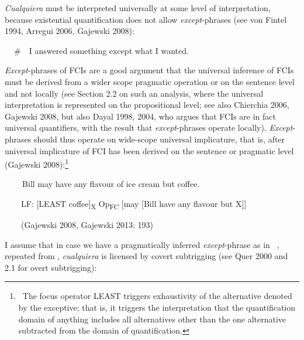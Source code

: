 \begin{styleStandard}
\textit{Cualquiera }must be interpreted universally at some level of interpretation, because existential quantification does not allow \textit{except}{}-phrases (see von Fintel 1994, Arregui 2006, Gajewski 2008):
\end{styleStandard}

\begin{styleStandard}
\textbf{\ \ }\#\ \ I answered something except what I wanted.
\end{styleStandard}

\begin{styleStandard}
\textit{Except}{}-phrases of FCIs are a good argument that the universal inference of FCIs must be derived from a wider scope pragmatic operation or on the sentence level and not locally (see Section 2.2 on such an analysis, where the universal interpretation is represented on the propositional level; see also Chierchia 2006, Gajewski 2008, but also Dayal 1998, 2004, who argues that FCIs are in fact universal quantifiers, with the result that \textit{except}{}-phrases operate locally). \textit{Except}{}-phrases should thus operate on wide-scope universal implicature, that is, after universal implicature of FCI has been derived on the sentence or pragmatic level (Gajewski 2008):\footnote{\textrm{\ The focus operator LEAST triggers exhaustivity of the alternative denoted by the exceptive; that is, it triggers the interpretation that the quantification domain of anything includes all alternatives other than the one alternative subtracted from the domain of quantification.}}
\end{styleStandard}

\begin{styleStandard}
\textbf{\ \ }\ \ Bill may have any flavour of ice cream but coffee.
\end{styleStandard}

\begin{styleStandard}
\ \ \ \ LF: [LEAST coffee]\textsubscript{X} Op\textsubscript{FC} [may [Bill have any flavour but X]]
\end{styleStandard}

\begin{styleStandard}
\ \ \ \ (Gajewski 2008, Gajewski 2013: 193)
\end{styleStandard}

\begin{styleStandard}
I assume that in case we have a pragmatically inferred \textit{except}{}-phrase as in \ , repeated from , \textit{cualquiera} is licensed by covert subtrigging (see Quer 2000 and 2.1 for overt subtrigging):
\end{styleStandard}

